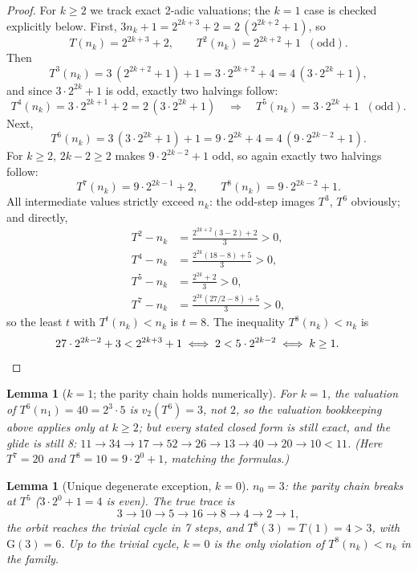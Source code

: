 \documentclass[11pt]{article}
\newtheorem{lemma}[theorem]{Lemma}
\theoremstyle{remark}
\newcommand{\T}{T}
\newcommand{\vtwo}{v_2}
\begin{document}
\begin{proof}
For $k \ge 2$ we track exact 2-adic valuations; the $k = 1$ case is checked
explicitly below. First, $3n_k + 1 = 2^{2k+3} + 2 = 2\,(2^{2k+2}+1)$, so
\[
  \T(n_k) = 2^{2k+3}+2, \qquad \T^2(n_k) = 2^{2k+2}+1 \;\;(\text{odd}).
\]
Then
\[
  \T^3(n_k) = 3\,(2^{2k+2}+1) + 1 = 3\cdot 2^{2k+2} + 4
           = 4\,(3\cdot 2^{2k} + 1),
\]
and since $3\cdot 2^{2k} + 1$ is odd, exactly two halvings follow:
\[
  \T^4(n_k) = 3\cdot 2^{2k+1} + 2 = 2\,(3\cdot 2^{2k}+1)
           \quad\Longrightarrow\quad
  \T^5(n_k) = 3\cdot 2^{2k} + 1 \;\;(\text{odd}).
\]
Next,
\[
  \T^6(n_k) = 3\,(3\cdot 2^{2k}+1) + 1 = 9\cdot 2^{2k} + 4
           = 4\,(9\cdot 2^{2k-2} + 1).
\]
For $k \ge 2$, $2k-2 \ge 2$ makes $9\cdot 2^{2k-2} + 1$ odd, so again
exactly two halvings follow:
\[
  \T^7(n_k) = 9\cdot 2^{2k-1} + 2, \qquad
  \T^8(n_k) = 9\cdot 2^{2k-2} + 1.
\]
All intermediate values strictly exceed $n_k$: the odd-step images $\T^3$,
$\T^6$ obviously; and directly,
\begin{align*}
  \T^2 - n_k &= \tfrac{2^{2k+2}(3-2)+2}{3} > 0,\\
  \T^4 - n_k &= \tfrac{2^{2k}(18-8)+5}{3} > 0,\\
  \T^5 - n_k &= \tfrac{2^{2k}+2}{3} > 0,\\
  \T^7 - n_k &= \tfrac{2^{2k}(27/2 - 8)+5}{3} > 0,
\end{align*}
so the least $t$ with $\T^t(n_k) < n_k$ is $t = 8$. The inequality
$\T^8(n_k) < n_k$ is
\[
  27\cdot 2^{2k-2} + 3 < 2^{2k+3} + 1
  \;\Longleftrightarrow\;
  2 < 5\cdot 2^{2k-2}
  \;\Longleftrightarrow\;
  k \ge 1. \qquad\qedhere
\]
\end{proof}

\begin{lemma}[$k = 1$; the parity chain holds numerically]
For $k = 1$, the valuation of $\T^6(n_1) = 40 = 2^3 \cdot 5$ is
$\vtwo(\T^6) = 3$, not $2$, so the valuation bookkeeping above applies only
at $k \ge 2$; but every stated closed form is still exact, and the glide is
still 8: $11 \to 34 \to 17 \to 52 \to 26 \to 13 \to 40 \to 20 \to
10 < 11$. (Here $\T^7 = 20$ and $\T^8 = 10 = 9\cdot 2^{0} + 1$, matching
the formulas.)
\end{lemma}

\begin{lemma}[Unique degenerate exception, $k = 0$]
$n_0 = 3$: the parity chain breaks at $\T^5$ ($3\cdot 2^0 + 1 = 4$ is
even). The true trace is
\[
  3 \to 10 \to 5 \to 16 \to 8 \to 4 \to 2 \to 1,
\]
the orbit reaches the trivial cycle in 7 steps, and $\T^8(3) = \T(1) = 4
> 3$, with $\mathrm{G}(3) = 6$. Up to the trivial cycle, $k = 0$ is the only
violation of $\T^8(n_k) < n_k$ in the family.
\end{lemma}
\end{document}

